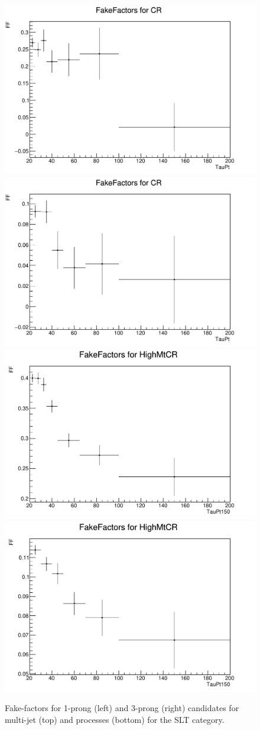 \begin{figure}
\centering
\includegraphics[width=.4\textwidth]{figures/lephadFF/SLT/FF_All_Preselection_Np1_CR_2tag_TauPt}
\includegraphics[width=.4\textwidth]{figures/lephadFF/SLT/FF_All_Preselection_Np3_CR_2tag_TauPt} \\
\includegraphics[width=.4\textwidth]{figures/lephadFF/SLT/FF_All_Preselection_Np1_HighMtCR_2tag_TauPt150}
\includegraphics[width=.4\textwidth]{figures/lephadFF/SLT/FF_All_Preselection_Np3_HighMtCR_2tag_TauPt150}\\
\caption{Fake-factors for 1-prong (left) and 3-prong (right) \tauhad candidates for multi-jet (top) and \ttbar processes (bottom) for the \lephad SLT category.}
\label{fig:SLT_FF}
\end{figure}

